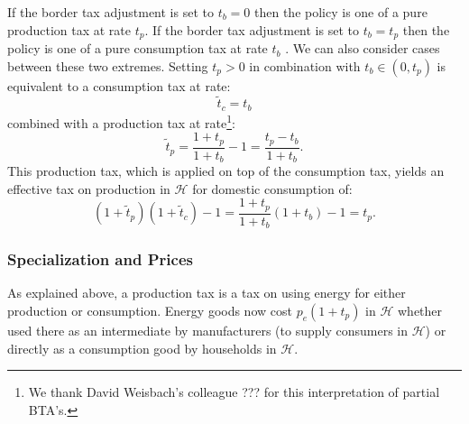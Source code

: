 \documentclass[notitlepage,12pt]{article}
\begin{document}
If the border tax adjustment is set to $t_{b}=0$ then the policy is one of a
pure production tax at rate $t_{p}$. If the border tax adjustment is set to $%
t_{b}=t_{p}$ then the policy is one of a pure consumption tax at rate $t_{b}$%
. We can also consider cases between these two extremes. Setting $t_{p}>0$
in combination with $t_{b}\in (0,t_{p})$ is equivalent to a consumption tax
at rate:%
\begin{equation*}
\tilde{t}_{c}=t_{b}
\end{equation*}%
combined with a production tax at rate\footnote{%
We thank David Weisbach's colleague ??? for this interpretation of partial
BTA's.}:%
\begin{equation*}
\tilde{t}_{p}=\frac{1+t_{p}}{1+t_{b}}-1=\frac{t_{p}-t_{b}}{1+t_{b}}.
\end{equation*}%
This production tax, which is applied on top of the consumption tax, yields
an effective tax on production in $\mathcal{H}$ for domestic consumption of:%
\begin{equation*}
\left( 1+\tilde{t}_{p}\right) \left( 1+\tilde{t}_{c}\right) -1=\frac{1+t_{p}%
}{1+t_{b}}\left( 1+t_{b}\right) -1=t_{p}.
\end{equation*}

\subsubsection{Specialization and Prices}

As explained above, a production tax is a tax on using energy for either
production or consumption. Energy goods now cost $p_{e}(1+t_{p})$ in $%
\mathcal{H}$ whether used there as an intermediate by manufacturers (to
supply consumers in $\mathcal{H}$) or directly as a consumption good by
households in $\mathcal{H}$.
\end{document}
